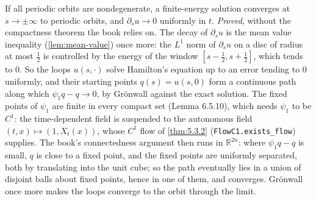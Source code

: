 \begin{theorem}
  \label{thm:6.5.6}
  \leanok
  If all periodic orbits are nondegenerate, a finite-energy solution converges at
  $s \to \pm\infty$ to periodic orbits, and $\partial_s u \to 0$ uniformly in
  $t$.  \emph{Proved}, without the compactness theorem the book relies on.  The
  decay of $\partial_s u$ is the mean value inequality (\ref{lem:mean-value})
  once more: the $L^1$ norm of $\partial_s u$ on a disc of radius at most
  $\tfrac12$ is controlled by the energy of the window $[s-\tfrac12, s+\tfrac12]$,
  which tends to $0$.  So the loops $u(s,\cdot)$ solve Hamilton's equation up to
  an error tending to $0$ uniformly, and their starting points $q(s) = u(s,0)$
  form a continuous path along which $\psi_1 q - q \to 0$, by Gr\"onwall against
  the exact solution.  The fixed points of $\psi_1$ are finite in every compact
  set (Lemma 6.5.10), which needs $\psi_1$ to be $C^1$: the time-dependent field
  is suspended to the autonomous field $(t,x) \mapsto (1, X_t(x))$, whose $C^1$
  flow of \ref{thm:5.3.2} (\texttt{FlowC1.exists\_flow}) supplies.  The book's connectedness argument then
  runs in $\mathbb{R}^{2n}$: where $\psi_1 q - q$ is small, $q$ is close to a
  fixed point, and the fixed points are uniformly separated, both by translating
  into the unit cube; so the path eventually lies in a union of disjoint balls
  about fixed points, hence in one of them, and converges.  Gr\"onwall once more
  makes the loops converge to the orbit through the limit.
\end{theorem}

